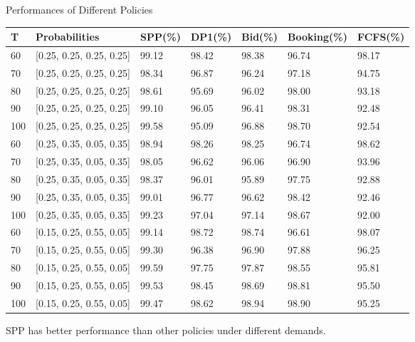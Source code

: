     \begin{frame}{Performances of Different Policies}
        \scriptsize
        \begin{table}[ht]
          \centering
          \begin{tabular}{|l|l|l|l|l|l|l|}
          \hline
           T & Probabilities & SPP(\%) & DP1(\%) & Bid(\%) & Booking(\%) & FCFS(\%) \\
          \hline
          60  & [0.25, 0.25, 0.25, 0.25]  & 99.12 & 98.42 & 98.38 & 96.74 & 98.17 \\
          70  & [0.25, 0.25, 0.25, 0.25]  & 98.34 & 96.87 & 96.24 & 97.18 & 94.75 \\
          80  & [0.25, 0.25, 0.25, 0.25]  & 98.61 & 95.69 & 96.02 & 98.00 & 93.18 \\
          90  & [0.25, 0.25, 0.25, 0.25]  & 99.10 & 96.05 & 96.41 & 98.31 & 92.48 \\
          100 & [0.25, 0.25, 0.25, 0.25]  & 99.58 & 95.09 & 96.88 & 98.70 & 92.54 \\
          \hline
          60  & [0.25, 0.35, 0.05, 0.35]  & 98.94 & 98.26 & 98.25 & 96.74 & 98.62 \\
          70  & [0.25, 0.35, 0.05, 0.35]  & 98.05 & 96.62 & 96.06 & 96.90 & 93.96 \\
          80  & [0.25, 0.35, 0.05, 0.35]  & 98.37 & 96.01 & 95.89 & 97.75 & 92.88 \\
          90  & [0.25, 0.35, 0.05, 0.35]  & 99.01 & 96.77 & 96.62 & 98.42 & 92.46 \\
          100 & [0.25, 0.35, 0.05, 0.35]  & 99.23 & 97.04 & 97.14 & 98.67 & 92.00 \\
          \hline
          60  & [0.15, 0.25, 0.55, 0.05]  & 99.14 & 98.72 & 98.74 & 96.61 & 98.07 \\
          70  & [0.15, 0.25, 0.55, 0.05]  & 99.30 & 96.38 & 96.90 & 97.88 & 96.25 \\
          80  & [0.15, 0.25, 0.55, 0.05]  & 99.59 & 97.75 & 97.87 & 98.55 & 95.81 \\
          90  & [0.15, 0.25, 0.55, 0.05]  & 99.53 & 98.45 & 98.69 & 98.81 & 95.50 \\
          100 & [0.15, 0.25, 0.55, 0.05]  & 99.47 & 98.62 & 98.94 & 98.90 & 95.25 \\
          \hline
          \end{tabular}
        \end{table}
        SPP has better performance than other policies under different demands.

    \end{frame}
      
